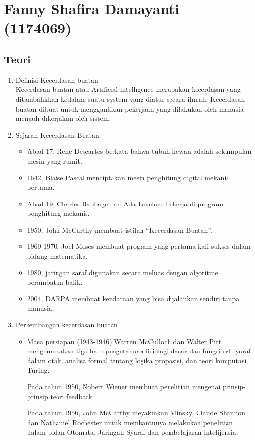 \section{Fanny Shafira Damayanti (1174069)}
\subsection{Teori}
\begin{enumerate}
\item Definisi Kecerdasan buatan\\ 
Kecerdasan buatan atau Artificial intelligence merupakan kecerdasan yang ditambahkkan kedalam suatu system yang diatur secara ilmiah. Kecerdasan buatan dibuat untuk menggantikan pekerjaan yang dilakukan oleh manusia menjadi dikerjakan oleh sistem.

\item Sejarah Kecerdasan Buatan
\begin{itemize}
\item Abad 17, Rene Descartes berkata bahwa tubuh hewan adalah sekumpulan mesin yang rumit.
\item 1642, Blaise Pascal menciptakan mesin penghitung digital mekanis pertama.
\item Abad 19, Charles Babbage dan Ada Lovelace bekerja di program penghitung mekanis.
\item 1950, John McCarthy membuat istilah “Kecerdasan Buatan”.
\item 1960-1970, Joel Moses membuat program yang pertama kali sukses dalam bidang matematika.
\item 1980, jaringan saraf digunakan secara meluas dengan algoritme perambatan balik.
\item 2004, DARPA membuat kendaraan yang bisa dijalankan sendiri tanpa manusia.
\end{itemize}

\item Perkembangan kecerdasan buatan
\begin{itemize}
\item Masa persiapan (1943-1946)
Warren McCulloch dan Walter Pitt mengemukakan tiga hal : pengetahuan fisiologi dasar dan fungsi sel syaraf dalam otak, analisa formal tentang logika proposisi, dan teori komputasi Turing.

Pada tahun 1950, Nobert Wiener membuat penelitian mengenai prinsip-prinsip teori feedback.

Pada tahun 1956, John McCarthy meyakinkan Minsky, Claude Shannon dan Nathaniel Rochester untuk membantunya melakukan penelitian dalam bidan Otomata, Jaringan Syaraf dan pembelajaran intelijensia. 


\end{itemize}
\end{enumerate}
